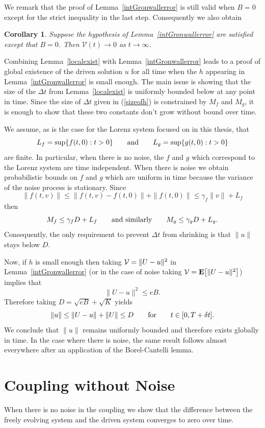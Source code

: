\documentclass[master,tocprelim,12pt]{unrthesis}
\newtheorem{corollary}{Corollary}[chapter]
\theoremstyle{definition}
\newcommand{\cV}{{\mathcal V}}
\def\wwords#1{\qquad\hbox{#1}\qquad}
\numberwithin{equation}{chapter}
\begin{document}
\begin{manuscript}
We remark that the proof of Lemma~\ref{intGronwallerror} is still valid
when $B=0$ except for the strict inequality in the last step.  
Consequently we also obtain
\begin{corollary}
\label{intGronwallerror0}
Suppose the hypothesis of Lemma~\ref{intGronwallerror}
are satisfied except that $B=0$.
Then $\cV(t)\to 0$ as $t\to\infty$.
\end{corollary}

Combining Lemma~\ref{localexist} with Lemma~\ref{intGronwallerror} 
leads to a proof of
global existence of the driven solution $u$ for all time
when the $h$ appearing in Lemma~\ref{intGronwallerror} is small enough.
The main issue is showing that the size of the $\Delta t$ from
Lemma~\ref{localexist} is uniformly bounded below at any point in time.
Since the size of $\Delta t$ given in (\ref{sizeofh}) is constrained 
by $M_f$ and $M_g$, it is enough to show that these two
constants don't grow without bound over time.

We assume, 
as is the case for the Lorenz system 
focused on in this thesis, 
that
$$
	L_f=\sup\{ f(t,0) : t>0 \}
\wwords{and}
	L_g=\sup\{ g(t,0) : t>0 \}
$$
are finite.  In particular, when there is no noise, the
$f$ and $g$ which correspond to the Lorenz system are time
independent.  When there is noise we obtain 
probabilistic bounds on $f$ and $g$ which are uniform in
time because the variance of the noise process is stationary.
Since
$$
	\| f(t,v)\| \le \|f(t,v)-f(t,0)\|+\|f(t,0)\|
		\le \gamma_f \|v\|+ L_f
$$
then
$$
	M_f\le \gamma_f D + L_f
\wwords{and similarly}
	M_g\le \gamma_g D + L_g.
$$
Consequently, the only requirement to prevent $\Delta t$ from shrinking
is that $\|u\|$ stays below $D$.  

Now, if $h$ is small enough
then taking ${\cal V}=\|U-u\|^2$ in Lemma~\ref{intGronwallerror}
(or in the case of noise taking
${\cal V}={\bf E}\big[\|U-u\|^2\big]$) implies that
$$
	\|U-u\|^2\le eB.
$$
Therefore taking $D=\sqrt{eB}+ \sqrt{K}$ yields
$$
	\|u\|\le \|U-u\|+\|U\|\le D
\wwords{for} t\in [0,T+\delta t].
$$
We conclude that $\|u\|$ remains uniformly bounded 
and therefore exists globally in time.
In the case where there is noise, the same result follows almost
everywhere after an application of the Borel-Cantelli lemma.

\chapter{Coupling without Noise}

When there is no noise in the coupling we 
show that the difference between the freely evolving system
and the driven system converges to zero over time.


\end{manuscript}
\end{document}

